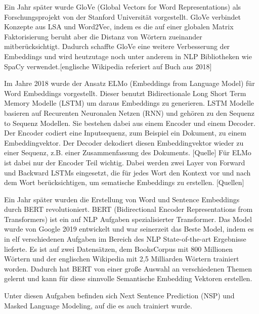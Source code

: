 Ein Jahr später wurde GloVe (Global Vectors for Word Representations) als Forschungsprojekt von der Stanford Universität vorgestellt. 
GloVe verbindet Konzepte aus LSA und Word2Vec, indem es die auf einer globalen Matrix Faktorisierung beruht aber die Distanz von Wörtern zueinander mitberücksichtigt.
Dadurch schaffte GloVe eine weitere Verbesserung der Embeddings und wird heutzutage noch unter anderem in NLP Bibliotheken wie SpaCy verwendet.[englische Wikipedia referiert auf Buch aus 2018]

Im Jahre 2018 wurde der Ansatz ELMo (Embeddings from Language Model) für Word Embeddings vorgestellt.
Dieser benutzt Bidirectionale Long Short Term Memory Modelle (LSTM) um daraus Embeddings zu generieren.
LSTM Modelle basieren auf Recurenten Neuronalen Netzen (RNN) und gehören zu den Sequenz to Sequenz Modellen. 
Sie bestehen dabei aus einem Encoder und einem Decoder.
Der Encoder codiert eine Inputsequenz, zum Beispiel ein Dokument, zu einem Embeddingvektor. 
Der Decoder dekodiert diesen Embeddingvektor wieder zu einer Sequenz, z.B. einer Zusammenfassung des Dokuments. [Quelle]
Für ELMo ist dabei nur der Encoder Teil wichtig.
Dabei werden zwei Layer von Forward und Backward LSTMs eingesetzt, die für jedes Wort den Kontext vor und nach dem Wort berücksichtigen, um sematische Embeddings zu erstellen. [Quellen]

Ein Jahr später wurden die Erstellung von Word und Sentence Embeddings durch BERT revolutioniert.
BERT (Bidirectional Encoder Representations from Transformers) \cite{devlin2019} ist ein auf NLP Aufgaben spezialisierter Transformer.
Das Model wurde von Google 2019 entwickelt und war seinerzeit das Beste Model, indem es in elf verschiedenen Aufgaben im Bereich des NLP State-of-the-art Ergebnisse lieferte.
Es ist auf zwei Datensätzen, dem BooksCorpus mit 800 Millionen Wörtern und der englischen Wikipedia mit 2,5 Milliarden Wörtern trainiert worden. \cite{devlin2019}
Dadurch hat BERT von einer große Auswahl an verschiedenen Themen gelernt und kann für diese sinnvolle Semantische Embedding Vektoren erstellen.













Unter diesen Aufgaben befinden sich Next Sentence Prediction (NSP) und Masked Language Modeling, auf die es auch trainiert wurde.



